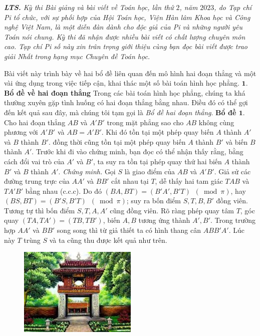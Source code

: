 	\textit{\textbf{\color{diendantoanhoc}LTS.} Kỳ thi Bài giảng và bài viết về Toán học, lần thứ $2$, năm $2023$, do Tạp chí Pi tổ chức, với sự phối hợp của Hội Toán học, Viện Hàn lâm Khoa học và Công nghệ Việt Nam, là một diễn đàn dành cho độc giả của Pi và những người yêu Toán nói chung. Kỳ thi đã nhận được nhiều bài viết có chất lượng chuyên môn cao. Tạp chí Pi số này xin trân trọng giới thiệu cùng bạn đọc bài viết được trao giải Nhất trong hạng mục Chuyên đề Toán học.}
\begin{multicols}{2}
	Bài viết này trình bày về hai bổ đề liên quan đến mô hình hai đoạn thẳng và một vài ứng dụng trong việc tiếp cận, khai thác một số bài toán hình học phẳng.
	\vskip 0.1cm
	\textbf{\color{diendantoanhoc}$\pmb{1.}$ Bổ đề về hai đoạn thẳng} 
	\vskip 0.1cm
	Trong các bài toán hình học phẳng, chúng ta khá thường xuyên gặp tình huống có hai đoạn thẳng bằng nhau. Điều đó có thể gợi đến kết quả sau đây, mà chúng tôi tạm gọi là \textit{Bổ đề hai đoạn thẳng}.
	\vskip 0.1cm 
	\textbf{\color{diendantoanhoc}Bổ đề $\pmb{1.}$} Cho hai đoạn thẳng $AB$ và $A'B'$ trong mặt phẳng sao cho $AB$ không cùng phương với $A'B'$ và $AB=A'B'$. Khi đó tồn tại một phép quay biến $A$ thành $A'$ và $B$ thành $B'$. đồng thời cũng tồn tại một phép quay biến $A$ thành $B'$ và biến $B$ thành $A'$.
	\vskip 0.1cm
	Trước khi đi vào chứng minh, bạn đọc có thể nhận thấy rằng, bằng cách đổi vai trò của $A'$ và $B'$, ta suy ra tồn tại phép quay thứ hai biến $A$ thành $B'$ và  $B$ thành $A'$.
	\vskip 0.1cm
	\textit{Chứng minh.} Gọi $S$ là giao điểm của $AB$ và $A'B'$. Giả sử các đường trung trực của $AA'$ và $BB'$ cắt nhau tại $T$, dễ thấy hai tam giác $TAB$ và $TA'B'$ bằng nhau (c.c.c). Do đó $(BA,BT)=(B'A',B'T)\,\,\,(\bmod \pi)$, hay $(BS,BT)=(B'S,B'T)\,\,\,(\bmod \pi)$; suy ra bốn điểm $S,T,B,B'$ đồng viên. Tương tự thì bốn điểm $S,T,A,A'$ cũng đồng viên. Rõ ràng phép quay tâm $T$, góc quay $(TA,TA')=(TB,TB')$, biến  $A,B$ tương ứng thành $A',B'$. Trong trường hợp $AA'$ và $BB'$ song song thì từ giả thiết ta có hình thang cân $ABB'A'$. Lúc này $T$ trùng $S$ và ta cũng thu được kết quả như trên.
	\begin{figure}[H]
		\vspace*{-5pt}
		\centering
		\captionsetup{labelformat= empty, justification=centering}
		\includegraphics[scale=0.63]{1}

\end{figure}
\end{multicols}
